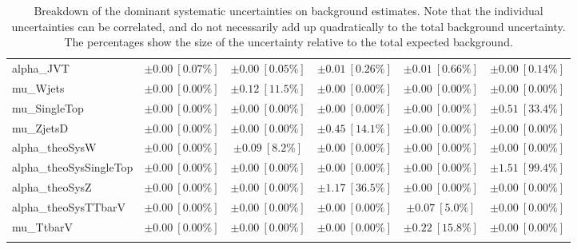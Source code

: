 \begin{sidewaystable}
\begin{center}
\begin{tabular*}{\textwidth}{@{\extracolsep{\fill}}lccccc}
alpha\_JVT         & $\pm 0.00\ [0.07\%] $          & $\pm 0.00\ [0.05\%] $          & $\pm 0.01\ [0.26\%] $          & $\pm 0.01\ [0.66\%] $          & $\pm 0.00\ [0.14\%] $       \\
mu\_Wjets         & $\pm 0.00\ [0.00\%] $          & $\pm 0.12\ [11.5\%] $          & $\pm 0.00\ [0.00\%] $          & $\pm 0.00\ [0.00\%] $          & $\pm 0.00\ [0.00\%] $       \\
mu\_SingleTop         & $\pm 0.00\ [0.00\%] $          & $\pm 0.00\ [0.00\%] $          & $\pm 0.00\ [0.00\%] $          & $\pm 0.00\ [0.00\%] $          & $\pm 0.51\ [33.4\%] $       \\
mu\_ZjetsD         & $\pm 0.00\ [0.00\%] $          & $\pm 0.00\ [0.00\%] $          & $\pm 0.45\ [14.1\%] $          & $\pm 0.00\ [0.00\%] $          & $\pm 0.00\ [0.00\%] $       \\
alpha\_theoSysW         & $\pm 0.00\ [0.00\%] $          & $\pm 0.09\ [8.2\%] $          & $\pm 0.00\ [0.00\%] $          & $\pm 0.00\ [0.00\%] $          & $\pm 0.00\ [0.00\%] $       \\
alpha\_theoSysSingleTop         & $\pm 0.00\ [0.00\%] $          & $\pm 0.00\ [0.00\%] $          & $\pm 0.00\ [0.00\%] $          & $\pm 0.00\ [0.00\%] $          & $\pm 1.51\ [99.4\%] $       \\
alpha\_theoSysZ         & $\pm 0.00\ [0.00\%] $          & $\pm 0.00\ [0.00\%] $          & $\pm 1.17\ [36.5\%] $          & $\pm 0.00\ [0.00\%] $          & $\pm 0.00\ [0.00\%] $       \\
alpha\_theoSysTTbarV         & $\pm 0.00\ [0.00\%] $          & $\pm 0.00\ [0.00\%] $          & $\pm 0.00\ [0.00\%] $          & $\pm 0.07\ [5.0\%] $          & $\pm 0.00\ [0.00\%] $       \\
mu\_TtbarV         & $\pm 0.00\ [0.00\%] $          & $\pm 0.00\ [0.00\%] $          & $\pm 0.00\ [0.00\%] $          & $\pm 0.22\ [15.8\%] $          & $\pm 0.00\ [0.00\%] $       \\
\noalign{\smallskip}\hline\noalign{\smallskip}
\end{tabular*}
\end{center}
\caption[Breakdown of uncertainty on background estimates]{
Breakdown of the dominant systematic uncertainties on background estimates.
Note that the individual uncertainties can be correlated, and do not necessarily add up quadratically to 
the total background uncertainty. The percentages show the size of the uncertainty relative to the total expected background.
\label{table.results.bkgestimate.uncertainties.SRD_high_bybkg}}
\end{sidewaystable}
%